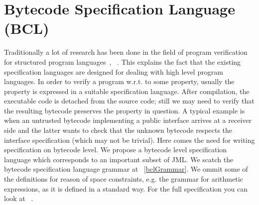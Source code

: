 
\section{Bytecode Specification Language (BCL)}\label{bcSpecLg}
Traditionally a lot of research has been done in the field of program verification for structured program languages~\cite{WPCDS},
~\cite{DisDij}. This explains the fact that the existing specification languages are designed for dealing with high level program languages. In order to verify 
a program w.r.t. to some property, usually the property is expressed in a suitable specification language.
After compilation, the executable code is detached from the source code; still we may need to verify that the resulting bytecode 
preserves the property in question. A typical example is when an untrusted bytecode implementing a public interface arrives at a 
receiver side and the latter wants to check that the unknown  bytecode respects the interface specification (which may not be trivial). Here comes the need for writing specification on  bytecode level. 
We propose a bytecode level specification language which corresponds to an important subset of JML.
We scatch the bytecode specification language grammar at \fig~\ref{bclGrammar}. We ommit some of the definitions for reason of space constraints,
 e.g. the grammar for arithmetic expressions, as it is defined in a standard way. For the full specification you can look at ~\cite{JML2BCSpec}.  
